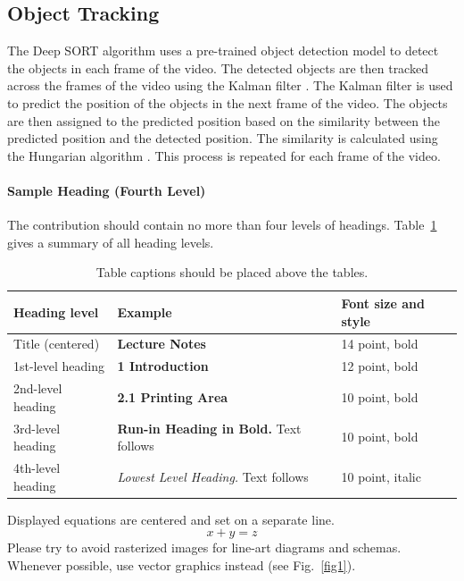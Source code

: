 \documentclass[runningheads]{llncs}
\begin{document}
\subsection{Object Tracking}
The Deep SORT algorithm uses a pre-trained object detection model to detect the objects in each frame of the video.
The detected objects are then tracked across the frames of the video using the Kalman filter \cite{kalman1960new}.
The Kalman filter is used to predict the position of the objects in the next frame of the video.
The objects are then assigned to the predicted position based on the similarity between the predicted position and the detected position.
The similarity is calculated using the Hungarian algorithm \cite{hungarian1955}.
This process is repeated for each frame of the video.


\paragraph{Sample Heading (Fourth Level)}
The contribution should contain no more than four levels of
headings. Table~\ref{tab1} gives a summary of all heading levels.

\begin{table}
\caption{Table captions should be placed above the
tables.}\label{tab1}
\begin{tabular}{|l|l|l|}
\hline
Heading level &  Example & Font size and style\\
\hline
Title (centered) &  {\Large\bfseries Lecture Notes} & 14 point, bold\\
1st-level heading &  {\large\bfseries 1 Introduction} & 12 point, bold\\
2nd-level heading & {\bfseries 2.1 Printing Area} & 10 point, bold\\
3rd-level heading & {\bfseries Run-in Heading in Bold.} Text follows & 10 point, bold\\
4th-level heading & {\itshape Lowest Level Heading.} Text follows & 10 point, italic\\
\hline
\end{tabular}
\end{table}


\noindent Displayed equations are centered and set on a separate
line.
\begin{equation}
x + y = z
\end{equation}
Please try to avoid rasterized images for line-art diagrams and
schemas. Whenever possible, use vector graphics instead (see
Fig.~\ref{fig1}).
\end{document}
